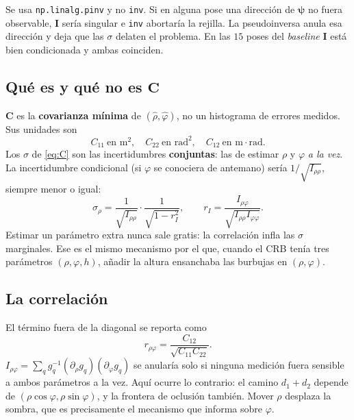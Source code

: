 \documentclass[11pt,a4paper]{article}
\newcommand{\vect}[1]{\boldsymbol{#1}}
\newcommand{\matr}[1]{\mathbf{#1}}
\newcommand{\code}[1]{\texttt{#1}}
\theoremstyle{definition}
\theoremstyle{plain}
\begin{document}
Se usa \code{np.linalg.pinv} y no \code{inv}. Si en alguna pose una direcci\'on
de $\vect\psi$ no fuera observable, $\matr I$ ser\'ia singular e \code{inv}
abortar\'ia la rejilla. La pseudoinversa anula esa direcci\'on y deja que las
$\sigma$ delaten el problema. En las $15$ poses del \emph{baseline} $\matr I$
est\'a bien condicionada y ambas coinciden.

\subsection{Qu\'e es y qu\'e no es $\matr C$}

$\matr C$ es la \textbf{covarianza m\'inima} de $(\hat\rho,\hat\varphi)$, no un
histograma de errores medidos. Sus unidades son
%
\[
C_{11}\ \text{en m}^2,\quad
C_{22}\ \text{en rad}^2,\quad
C_{12}\ \text{en m}\cdot\text{rad}.
\]
%
Los $\sigma$ de \eqref{eq:C} son las incertidumbres \textbf{conjuntas}: las de
estimar $\rho$ y $\varphi$ \emph{a la vez}. La incertidumbre condicional (si
$\varphi$ se conociera de antemano) ser\'ia $1/\sqrt{I_{\rho\rho}}$, siempre
menor o igual:
%
\begin{equation}
\label{eq:cond}
\sigma_\rho
= \frac{1}{\sqrt{I_{\rho\rho}}}\cdot\frac{1}{\sqrt{1-r_I^2}},
\qquad
r_I=\frac{I_{\rho\varphi}}{\sqrt{I_{\rho\rho}I_{\varphi\varphi}}}.
\end{equation}
%
Estimar un par\'ametro extra nunca sale gratis: la correlaci\'on infla las
$\sigma$ marginales. Ese es el mismo mecanismo por el que, cuando el CRB ten\'ia
tres par\'ametros $(\rho,\varphi,h)$, a\~nadir la altura ensanchaba las
burbujas en $(\rho,\varphi)$.

\subsection{La correlaci\'on}

El t\'ermino fuera de la diagonal se reporta como
%
\begin{equation}
\label{eq:corr}
r_{\rho\varphi}
= \frac{C_{12}}{\sqrt{C_{11}C_{22}}}.
\end{equation}
%
$I_{\rho\varphi}=\sum_q g_q^{-1}(\partial_\rho g_q)(\partial_\varphi g_q)$ se
anular\'ia solo si ninguna medici\'on fuera sensible a ambos par\'ametros a la
vez. Aqu\'i ocurre lo contrario: el camino $d_1+d_2$ depende de
$(\rho\cos\varphi,\rho\sin\varphi)$, y la frontera de oclusi\'on tambi\'en.
Mover $\rho$ desplaza la sombra, que es precisamente el mecanismo que informa
sobre $\varphi$.
\end{document}
